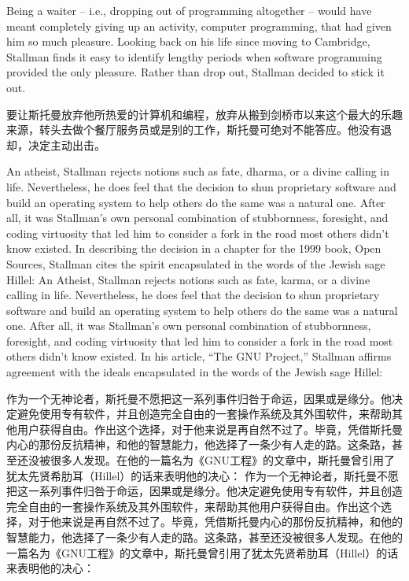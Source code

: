 \ifdefined\eng
Being a waiter -- i.e., dropping out of programming altogether -- would have meant completely giving up an activity, computer programming, that had given him so much pleasure. Looking back on his life since moving to Cambridge, Stallman finds it easy to identify lengthy periods when software programming provided the only pleasure. Rather than drop out, Stallman decided to stick it out.
\fi

\ifdefined\chs
要让斯托曼放弃他所热爱的计算机和编程，放弃从搬到剑桥市以来这个最大的乐趣来源，转头去做个餐厅服务员或是别的工作，斯托曼可绝对不能答应。他没有退却，决定主动出击。
\fi

\ifdefined\eng
\ifdefined\vone
An atheist, Stallman rejects notions such as fate, dharma, or a divine calling in life. Nevertheless, he does feel that the decision to shun proprietary software and build an operating system to help others do the same was a natural one. After all, it was Stallman's own personal combination of stubbornness, foresight, and coding virtuosity that led him to consider a fork in the road most others didn't know existed. In describing the decision in a chapter for the 1999 book, Open Sources, Stallman cites the spirit encapsulated in the words of the Jewish sage Hillel:
\fi
\ifdefined\vtwo
An Atheist, Stallman rejects notions such as fate, karma, or a divine calling in life. Nevertheless, he does feel that the decision to shun proprietary software and build an operating system to help others do the same was a natural one. After all, it was Stallman's own personal combination of stubbornness, foresight, and coding virtuosity that led him to consider a fork in the road most others didn't know existed. In his article, ``The GNU Project,'' Stallman affirms agreement with the ideals encapsulated in the words of the Jewish sage Hillel:
\fi
\fi

\ifdefined\chs
\ifdefined\vone
作为一个无神论者，斯托曼不愿把这一系列事件归咎于命运，因果或是缘分。他决定避免使用专有软件，并且创造完全自由的一套操作系统及其外围软件，来帮助其他用户获得自由。作出这个选择，对于他来说是再自然不过了。毕竟，凭借斯托曼内心的那份反抗精神，和他的智慧能力，他选择了一条少有人走的路。这条路，甚至还没被很多人发现。在他的一篇名为《GNU工程》的文章中，斯托曼曾引用了犹太先贤希肋耳（Hillel）的话来表明他的决心：
\fi
\ifdefined\vtwo
作为一个无神论者，斯托曼不愿把这一系列事件归咎于命运，因果或是缘分。他决定避免使用专有软件，并且创造完全自由的一套操作系统及其外围软件，来帮助其他用户获得自由。作出这个选择，对于他来说是再自然不过了。毕竟，凭借斯托曼内心的那份反抗精神，和他的智慧能力，他选择了一条少有人走的路。这条路，甚至还没被很多人发现。在他的一篇名为《GNU工程》的文章中，斯托曼曾引用了犹太先贤希肋耳（Hillel）的话来表明他的决心：
\fi
\fi


